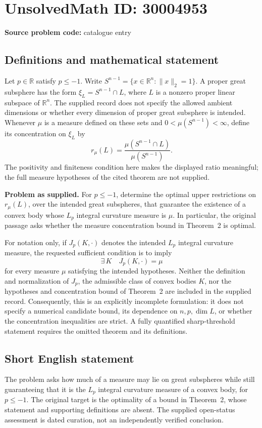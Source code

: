 \documentclass[11pt]{article}
\newcommand{\R}{\mathbb{R}}
\begin{document}
\section*{UnsolvedMath ID: 30004953}
\textbf{Source problem code:} catalogue entry
\subsection{Definitions and mathematical statement}
Let \(p\in\R\) satisfy \(p\leq -1\). Write \(S^{n-1}=\{x\in\R^n:\|x\|_2=1\}\). A proper great subsphere has the form \(\xi_L=S^{n-1}\cap L\), where \(L\) is a nonzero proper linear subspace of \(\R^n\). The supplied record does not specify the allowed ambient dimensions or whether every dimension of proper great subsphere is intended. Whenever \(\mu\) is a measure defined on these sets and \(0<\mu(S^{n-1})<\infty\), define its concentration on \(\xi_L\) by
\[
 r_\mu(L)=\frac{\mu(S^{n-1}\cap L)}{\mu(S^{n-1})}.
\]
The positivity and finiteness condition here makes the displayed ratio meaningful; the full measure hypotheses of the cited theorem are not supplied.

\textbf{Problem as supplied.} For \(p\leq -1\), determine the optimal upper restrictions on \(r_\mu(L)\), over the intended great subspheres, that guarantee the existence of a convex body whose \(L_p\) integral curvature measure is \(\mu\). In particular, the original passage asks whether the measure concentration bound in Theorem~2 is optimal.

For notation only, if \(J_p(K,\cdot)\) denotes the intended \(L_p\) integral curvature measure, the requested sufficient condition is to imply
\[
 \exists\,K\quad J_p(K,\cdot)=\mu
\]
for every measure \(\mu\) satisfying the intended hypotheses. Neither the definition and normalization of \(J_p\), the admissible class of convex bodies \(K\), nor the hypotheses and concentration bound of Theorem~2 are included in the supplied record. Consequently, this is an explicitly incomplete formulation: it does not specify a numerical candidate bound, its dependence on \(n,p,\dim L\), or whether the concentration inequalities are strict. A fully quantified sharp-threshold statement requires the omitted theorem and its definitions.
\subsection{Short English statement}
The problem asks how much of a measure may lie on great subspheres while still guaranteeing that it is the \(L_p\) integral curvature measure of a convex body, for \(p\leq -1\). The original target is the optimality of a bound in Theorem~2, whose statement and supporting definitions are absent. The supplied open-status assessment is dated curation, not an independently verified conclusion.
\end{document}
